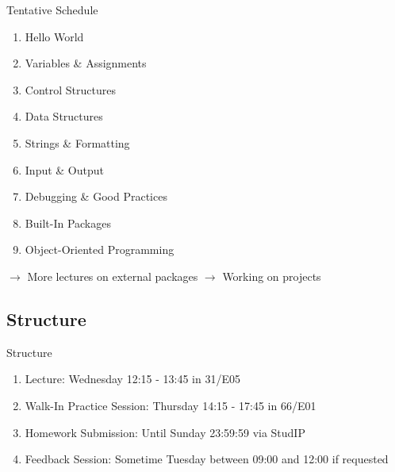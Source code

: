 \begin{frame}{Tentative Schedule}

    \begin{enumerate}
        \item Hello World
        \item Variables \& Assignments
        \item Control Structures
        \item Data Structures
        \item Strings \& Formatting
        \item Input \& Output
        \item Debugging \& Good Practices
        \item Built-In Packages
        \item Object-Oriented Programming
    \end{enumerate}
    $\rightarrow$ More lectures on external packages %
    $\rightarrow$ Working on projects

\end{frame}

\subsection{Structure}

\begin{frame}{Structure}

    \begin{enumerate}
        \item Lecture:
        \newline Wednesday 12:15 - 13:45 in 31/E05
        \item Walk-In Practice Session:
        \newline Thursday 14:15 - 17:45 in 66/E01
        \item Homework Submission:
        \newline Until Sunday 23:59:59 via StudIP
        \item Feedback Session:
        \newline Sometime Tuesday between 09:00 and 12:00 if requested
    \end{enumerate}


\end{frame}

